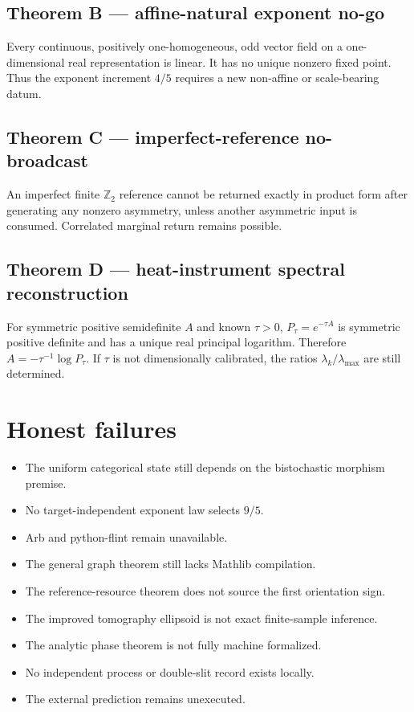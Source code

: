 \documentclass[11pt,a4paper,openany]{report}
\begin{document}
\subsection{Theorem B --- affine-natural exponent no-go}

Every continuous, positively one-homogeneous, odd vector field on a one-dimensional real representation is linear. It has no unique nonzero fixed point. Thus the exponent increment \(4/5\) requires a new non-affine or scale-bearing datum.

\subsection{Theorem C --- imperfect-reference no-broadcast}

An imperfect finite \(\mathbb Z_2\) reference cannot be returned exactly in product form after generating any nonzero asymmetry, unless another asymmetric input is consumed. Correlated marginal return remains possible.

\subsection{Theorem D --- heat-instrument spectral reconstruction}

For symmetric positive semidefinite \(A\) and known \(\tau>0\), \(P_\tau=e^{-\tau A}\) is symmetric positive definite and has a unique real principal logarithm. Therefore \(A=-\tau^{-1}\log P_\tau\). If \(\tau\) is not dimensionally calibrated, the ratios \(\lambda_k/\lambda_{\max}\) are still determined.

\section{Honest failures}

\begin{itemize}
\item 
The uniform categorical state still depends on the bistochastic morphism premise.

\item 
No target-independent exponent law selects \(9/5\).

\item 
Arb and python-flint remain unavailable.

\item 
The general graph theorem still lacks Mathlib compilation.

\item 
The reference-resource theorem does not source the first orientation sign.

\item 
The improved tomography ellipsoid is not exact finite-sample inference.

\item 
The analytic phase theorem is not fully machine formalized.

\item 
No independent process or double-slit record exists locally.

\item 
The external prediction remains unexecuted.

\end{itemize}
\end{document}
